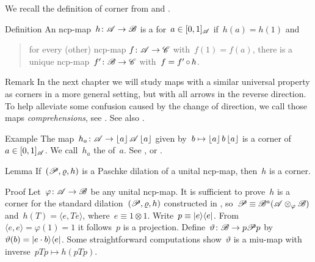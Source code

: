 \documentclass[b]{subfiles}
\begin{document}
\begin{parsec}%
\begin{point}%
We recall the definition of corner
        from \cite[Dfn.~2]{westerbaan2016universal} and .
\end{point}
\begin{point}{Definition}%
An ncp-map~$h \colon \mathscr{A} \to \mathscr{B}$
is a  for~$a \in [0,1]_{\mathscr{A}}$ if~$h(a)=h(1)$
    and
    \begin{quote}
        for every (other) ncp-map $f\colon \mathscr{A} \to \mathscr{C}$
            with~$f(1)=f(a)$,
            there is a unique ncp-map~$f'\colon \mathscr{B} \to \mathscr{C}$
            with~$f = f' \mathop{\circ} h$.
    \end{quote}
\begin{point}{Remark}%
In the next chapter we will study maps with a similar universal property
    as corners in a more general setting,
    but with all arrows in the reverse direction.
To help alleviate some confusion caused by the change of direction,
    we call those maps \emph{comprehensions},
    see .  See also .
\end{point}
\end{point}
\begin{point}{Example}%
    The map~$h_a \colon \mathscr{A} \to \left\lfloor a\right\rfloor \mathscr{A} \left\lfloor a\right\rfloor$ given
    by~$b \mapsto \left\lfloor a\right\rfloor b \left\lfloor a\right\rfloor$
    is a corner of~$a \in [0,1]_{\mathscr{A}}$.
    We call~$h_a$ the  of~$a$.
    See , 
        or \cite[Prop.~5]{westerbaan2016universal}.
\end{point}
\begin{point}{Lemma}%
If~$(\mathscr{P}, \varrho, h)$ is a Paschke dilation of a unital ncp-map,
    then~$h$ is a corner.
\begin{point}{Proof}%
Let~$\varphi \colon \mathscr{A} \to \mathscr{B}$ be any unital ncp-map.
It is sufficient to prove~$h$
    is a corner for the
    standard dilation~$(\mathscr{P} , \varrho, h)$
    constructed in ,
    so~$\mathscr{P} \equiv \mathscr{B}^a(\mathscr{A} \otimes_\varphi \mathscr{B})$
    and~$h(T) = \langle e, T e\rangle$, where~$e \equiv 1\otimes 1$.
    Write~$p \equiv \left|e\right>\!\left<e\right|$.
From~$\langle e,e\rangle = \varphi(1) = 1$
    it follows~$p$ is a projection.
Define~$\vartheta\colon \mathscr{B} \to p \mathscr{P} p$
    by~$\vartheta(b) = \left|e \cdot b\right>\!\left<e\right|$.
Some straightforward computations
    show~$\vartheta$ is a miu-map
    with inverse~$pTp \mapsto h(pTp)$.

\end{point}
\end{point}
\end{parsec}
\end{document}
